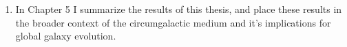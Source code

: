\begin{enumerate}
\item{ In Chapter 5 I summarize the results of this thesis, and place these results in the broader context of the circumgalactic medium and it's implications for global galaxy evolution.}

\end{enumerate}


{}


